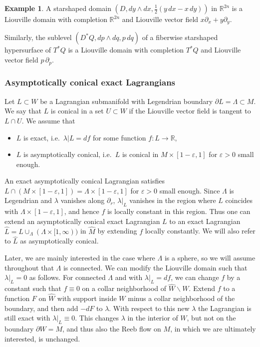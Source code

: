 \documentclass{amsart}
\newcommand{\RR}{\mathbb{R}}
\newcommand{\haat}{\widehat}
\theoremstyle{definition}
\newtheorem{example}[proposition]{Example}
\theoremstyle{remark}
\numberwithin{equation}{section}
\begin{document}
\begin{example}\label{example}
	A starshaped domain $(D,dy\wedge dx,\frac12(y\,dx-x\,dy))$ in $\RR^{2n}$ is a Liouville domain with completion $\RR^{2n}$ and Liouville vector field $x\partial_x+y\partial_y$.

	Similarly, the sublevel $(D^*Q,dp\wedge dq, p\,dq)$ of a fiberwise starshaped hypersurface of $T^*Q$ is a Liouville domain with completion $T^*Q$ and Liouville vector field $p\,\partial_p$.
\end{example}

\subsubsection*{Asymptotically conical exact Lagrangians}
Let $L\subset W$ be a Lagrangian submanifold with Legendrian boundary $\partial L=\Lambda\subset M$. We say that $L$ is conical in a set $U\subset W$ if the Liouville vector field is tangent to $L\cap U$. We assume that
\begin{itemize}
\item $L$ is exact, i.e.\ $\lambda|L=df$ for some function $f:L\to \RR$,
\item $L$ is asymptotically conical, i.e.\ $L$ is conical in $M\times [1-\varepsilon,1]$ for $\varepsilon>0$ small enough.
\end{itemize}
An exact asymptotically conical Lagrangian satisfies $L\cap (M\times [1-\varepsilon,1])=\Lambda\times [1-\varepsilon,1]$ for $\varepsilon>0$ small enough. Since $\Lambda$ is Legendrian and $\lambda$ vanishes along $\partial_r$, $\lambda|_L$ vanishes in the region where $L$ coincides with $\Lambda\times [1-\varepsilon,1]$, and hence $f$ is locally constant in this region. Thus one can extend an asymptotically conical exact Lagrangian $L$ to an exact Lagrangian $\haat L=L\cup_\Lambda(\Lambda\times[1,\infty))$ in $\haat M$ by extending $f$ locally constantly. We will also refer to $\haat L$ as asymptotically conical.

Later, we are mainly interested in the case where $\Lambda$ is a sphere, so we will assume throughout that $\Lambda$ is connected. We can modify the Liouville domain such that $\lambda|_L=0$ as follows. For connected $\Lambda$ and with $\lambda|_L=df$, we can change $f$ by a constant such that $f\equiv 0$ on a collar neighborhood of $\haat W\backslash W$. Extend $f$ to a function $F$ on $\haat W$ with support inside $W$ minus a collar neighborhood of the boundary, and then add $-dF$ to $\lambda$. With respect to this new $\lambda$ the Lagrangian is still exact with $\lambda|_{L}\equiv 0$. This changes $\lambda$ in the interior of $W$, but not on the boundary $\partial W=M$, and thus also the Reeb flow on $M$, in which we are ultimately interested, is unchanged.
\end{document}
